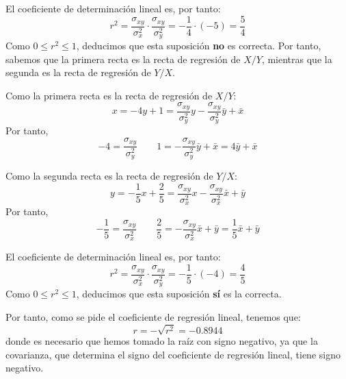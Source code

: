\begin{ejercicio}
    El coeficiente de determinación lineal es, por tanto:
    \begin{equation*}
        r^2 = \frac{\sigma_{xy}}{\sigma_x^2} \cdot \frac{\sigma_{xy}}{\sigma_y^2} = -\frac{1}{4}\cdot (-5) = \frac{5}{4}
    \end{equation*}
    Como $0\leq r^2 \leq 1$, deducimos que esta suposición \textbf{no} es correcta. Por tanto, sabemos que la primera recta es la recta de regresión de $X/Y$, mientras que la segunda es la recta de regresión de $Y/X$.
    
    Como la primera recta es la recta de regresión de $X/Y$:
    \begin{equation*}
       x=-4y+1 = \frac{\sigma_{xy}}{\sigma_y^2}y -\frac{\sigma_{xy}}{\sigma_y^2}\bar{y} + \bar{x}
    \end{equation*}
    Por tanto,
    \begin{equation*}
        -4 = \frac{\sigma_{xy}}{\sigma_y^2} \qquad 1=-\frac{\sigma_{xy}}{\sigma_y^2}\bar{y} + \bar{x} = 4\bar{y} + \bar{x}
    \end{equation*}

    Como la segunda recta es la recta de regresión de $Y/X$:
    \begin{equation*}
        y=-\frac{1}{5}x+\frac{2}{5} = \frac{\sigma_{xy}}{\sigma_x^2}x -\frac{\sigma_{xy}}{\sigma_x^2}\bar{x} + \bar{y}
    \end{equation*}
    Por tanto,
    \begin{equation*}
       -\frac{1}{5} = \frac{\sigma_{xy}}{\sigma_x^2} \qquad \frac{2}{5}=-\frac{\sigma_{xy}}{\sigma_x^2}\bar{x} + \bar{y} = \frac{1}{5}\bar{x} + \bar{y}
    \end{equation*}

    El coeficiente de determinación lineal es, por tanto:
    \begin{equation*}
        r^2 = \frac{\sigma_{xy}}{\sigma_x^2} \cdot \frac{\sigma_{xy}}{\sigma_y^2} = -\frac{1}{5}\cdot (-4) = \frac{4}{5}
    \end{equation*}
    Como $0\leq r^2 \leq 1$, deducimos que esta suposición \textbf{sí} es la correcta.

    Por tanto, como se pide el coeficiente de regresión lineal, tenemos que:
    \begin{equation*}
        r = -\sqrt{r^2} = -0.8944
    \end{equation*}
    donde es necesario que hemos tomado la raíz con signo negativo, ya que la covarianza, que determina el signo del coeficiente de regresión lineal,  tiene signo negativo.
\end{ejercicio}


